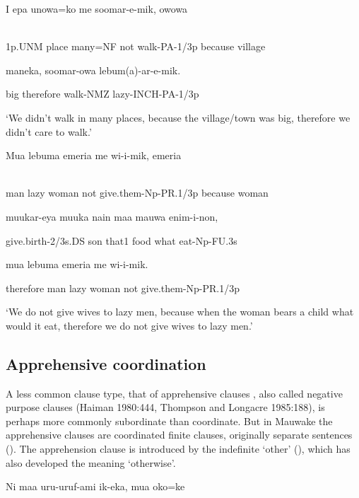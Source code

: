 \ea%
\label{ex:x1422}
\gll I  epa  unowa=ko  me  soomar-e-mik,    owowa \\
      \\
\glt
\z

1p.UNM  place  many=NF  not  walk-PA-1/3p  because  village

maneka,    soomar-owa  lebum(a)-ar-e-mik.

big  therefore  walk-NMZ  lazy-INCH-PA-1/3p

`We didn't walk in many places, because the village/town was big, therefore we didn't care to walk.'

\ea%
\label{ex:x1423}
\gll Mua  lebuma  emeria  me  wi-i-mik,    emeria  \\
      \\
\glt
\z

man  lazy  woman  not  give.them-Np-PR.1/3p  because  woman

muukar-eya  muuka  nain  maa  mauwa  enim-i-non,

give.birth-2/3s.DS  son  that1  food  what  eat-Np-FU.3s

  mua  lebuma  emeria  me  wi-i-mik.

therefore  man  lazy  woman  not  give.them-Np-PR.1/3p

`We do not give wives to lazy men, because when the woman bears a child what would it eat, therefore we do not give wives to lazy men.'

\subsection{Apprehensive coordination}
\hypertarget{RefHeading23081935131865}{}
A less common clause type, that of apprehensive clauses \citep[61]{Roberts1987}, also called negative purpose clauses (Haiman 1980:444, Thompson and Longacre 1985:188), is perhaps more commonly subordinate than coordinate. But in Mauwake the apprehensive clauses are coordinated finite clauses, originally separate sentences (). The apprehension clause is introduced by the indefinite  `other' (), which has also developed the meaning `otherwise'.  

\ea%
\label{ex:x1426}
\gll Ni  maa  uru-uruf-ami  ik-eka,    mua  oko=ke \\
      \\
\glt
\z

